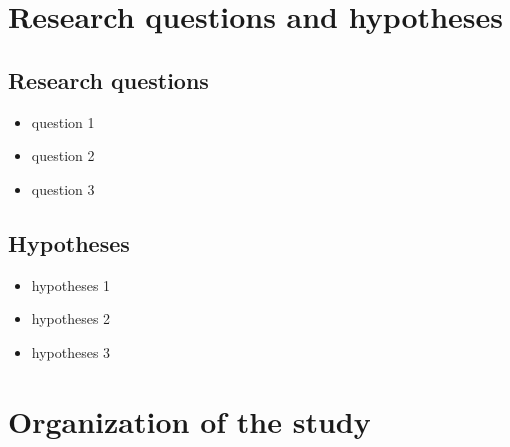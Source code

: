 \section{Research questions and hypotheses}
\subsection{Research questions}
\justifying
\begin{itemize}
    \item question 1
    \item question 2
    \item question 3
\end{itemize}
\subsection{Hypotheses}
\justifying
\begin{itemize}
    \item hypotheses 1
    \item hypotheses 2
    \item hypotheses 3
\end{itemize}


\section{Organization of the study}
\justifying
\lipsum[1]

